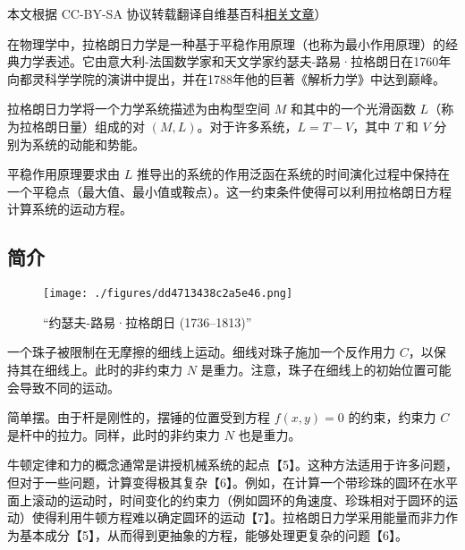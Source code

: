 
本文根据 CC-BY-SA 协议转载翻译自维基百科\href{https://en.wikipedia.org/wiki/Lagrangian_mechanics}{相关文章}）

在物理学中，拉格朗日力学是一种基于平稳作用原理（也称为最小作用原理）的经典力学表述。它由意大利-法国数学家和天文学家约瑟夫-路易·拉格朗日在1760年向都灵科学学院的演讲中提出，并在1788年他的巨著《解析力学》中达到巅峰。

拉格朗日力学将一个力学系统描述为由构型空间 \( M \) 和其中的一个光滑函数 \( L \)（称为拉格朗日量）组成的对 \( (M, L) \)。对于许多系统，\( L = T - V \)，其中 \( T \) 和 \( V \) 分别为系统的动能和势能。

平稳作用原理要求由 \( L \) 推导出的系统的作用泛函在系统的时间演化过程中保持在一个平稳点（最大值、最小值或鞍点）。这一约束条件使得可以利用拉格朗日方程计算系统的运动方程。
\subsection{简介}
\begin{figure}[ht]
\centering
\texttt{[image: ./figures/dd4713438c2a5e46.png]}
\caption{“约瑟夫-路易·拉格朗日 (1736–1813)”} \label{fig_LGL_1}
\end{figure}
一个珠子被限制在无摩擦的细线上运动。细线对珠子施加一个反作用力 \( C \)，以保持其在细线上。此时的非约束力 \( N \) 是重力。注意，珠子在细线上的初始位置可能会导致不同的运动。

简单摆。由于杆是刚性的，摆锤的位置受到方程 \( f(x, y) = 0 \) 的约束，约束力 \( C \) 是杆中的拉力。同样，此时的非约束力 \( N \) 也是重力。

牛顿定律和力的概念通常是讲授机械系统的起点【5】。这种方法适用于许多问题，但对于一些问题，计算变得极其复杂【6】。例如，在计算一个带珍珠的圆环在水平面上滚动的运动时，时间变化的约束力（例如圆环的角速度、珍珠相对于圆环的运动）使得利用牛顿方程难以确定圆环的运动【7】。拉格朗日力学采用能量而非力作为基本成分【5】，从而得到更抽象的方程，能够处理更复杂的问题【6】。

